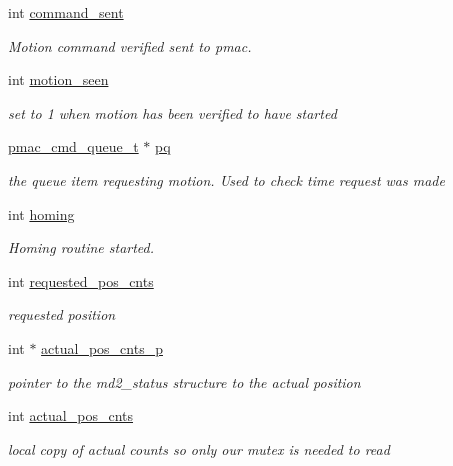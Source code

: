 \begin{DoxyCompactItemize}
int \hyperlink{structlspmac__motor__struct_a59a7f007476b2428fd3c5bd7f24440e8}{command\-\_\-sent}
\begin{DoxyCompactList}\small\item\em Motion command verified sent to pmac. \end{DoxyCompactList}\item 
int \hyperlink{structlspmac__motor__struct_a68c471836f52707fa8582f7860cf500f}{motion\-\_\-seen}
\begin{DoxyCompactList}\small\item\em set to 1 when motion has been verified to have started \end{DoxyCompactList}\item 
\hyperlink{pgpmac_8h_a99c275e32ad897dca34d196b91f038cb}{pmac\-\_\-cmd\-\_\-queue\-\_\-t} $\ast$ \hyperlink{structlspmac__motor__struct_a8caf0031e134e144bffc87d9d896d15b}{pq}
\begin{DoxyCompactList}\small\item\em the queue item requesting motion. Used to check time request was made \end{DoxyCompactList}\item 
int \hyperlink{structlspmac__motor__struct_aa74108855693f94fc2ff76333c9fb6ac}{homing}
\begin{DoxyCompactList}\small\item\em Homing routine started. \end{DoxyCompactList}\item 
int \hyperlink{structlspmac__motor__struct_a6e8dc9c11dc52a439fe9837230f93ce2}{requested\-\_\-pos\-\_\-cnts}
\begin{DoxyCompactList}\small\item\em requested position \end{DoxyCompactList}\item 
int $\ast$ \hyperlink{structlspmac__motor__struct_a312047bb71def5cd2443fecd875eaea5}{actual\-\_\-pos\-\_\-cnts\-\_\-p}
\begin{DoxyCompactList}\small\item\em pointer to the md2\-\_\-status structure to the actual position \end{DoxyCompactList}\item 
int \hyperlink{structlspmac__motor__struct_ae5c7aea45b9637a1817be246688fd980}{actual\-\_\-pos\-\_\-cnts}
\begin{DoxyCompactList}\small\item\em local copy of actual counts so only our mutex is needed to read \end{DoxyCompactList}\item 

\end{DoxyCompactItemize}
